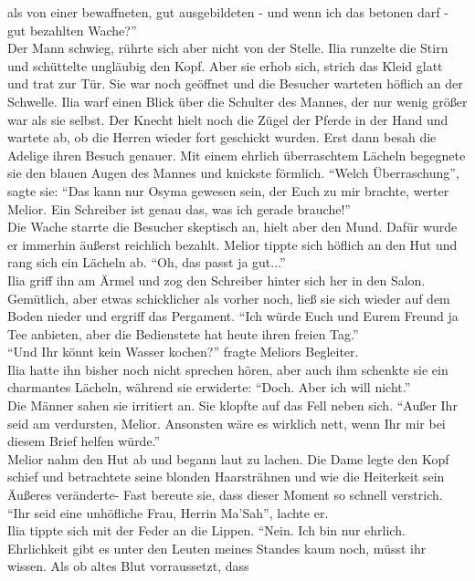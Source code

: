 als von einer bewaffneten, gut ausgebildeten - und wenn ich das betonen darf - gut bezahlten 
Wache?''\\
Der Mann schwieg, rührte sich aber nicht von der Stelle. Ilia runzelte die Stirn und schüttelte 
ungläubig den Kopf. Aber sie erhob sich, strich das Kleid glatt und trat zur Tür. Sie war noch 
geöffnet und die Besucher warteten höflich an der Schwelle. Ilia warf einen Blick über die Schulter 
des Mannes, der nur wenig größer war als sie selbst. Der Knecht hielt noch die Zügel der Pferde in 
der Hand und wartete ab, ob die Herren wieder fort geschickt wurden. Erst dann besah die Adelige 
ihren Besuch genauer. Mit einem ehrlich überraschtem Lächeln begegnete sie den blauen Augen des 
Mannes und knickste förmlich. ``Welch Überraschung'', sagte sie: ``Das kann nur Osyma gewesen sein, 
der Euch zu mir brachte, werter Melior. Ein Schreiber ist genau das, was ich gerade brauche!''\\
Die Wache starrte die Besucher skeptisch an, hielt aber den Mund. Dafür wurde er immerhin äußerst 
reichlich bezahlt. Melior tippte sich höflich an den Hut und rang sich ein Lächeln ab. ``Oh, das 
passt ja gut...''\\
Ilia griff ihn am Ärmel und zog den Schreiber hinter sich her in den Salon. Gemütlich, aber etwas 
schicklicher als vorher noch, ließ sie sich wieder auf dem Boden nieder und ergriff das Pergament. 
``Ich würde Euch und Eurem Freund ja Tee anbieten, aber die Bedienstete hat heute ihren freien 
Tag.''\\
``Und Ihr könnt kein Wasser kochen?'' fragte Meliors Begleiter.\\
Ilia hatte ihn bisher noch nicht sprechen hören, aber auch ihm schenkte sie ein charmantes Lächeln, 
während sie erwiderte: ``Doch. Aber ich will nicht.''\\
Die Männer sahen sie irritiert an. Sie klopfte auf das Fell neben sich. ``Außer Ihr seid am 
verdursten, Melior. Ansonsten wäre es wirklich nett, wenn Ihr mir bei diesem Brief helfen würde.''\\
Melior nahm den Hut ab und begann laut zu lachen. Die Dame legte den Kopf schief und betrachtete 
seine blonden Haarsträhnen und wie die Heiterkeit sein Äußeres veränderte- Fast bereute sie, dass 
dieser Moment so schnell verstrich.\\
``Ihr seid eine unhöfliche Frau, Herrin Ma'Sah'', lachte er.\\
Ilia tippte sich mit der Feder an die Lippen. ``Nein. Ich bin nur ehrlich. Ehrlichkeit gibt es 
unter den Leuten meines Standes kaum noch, müsst ihr wissen. Als ob altes Blut vorraussetzt, dass 
